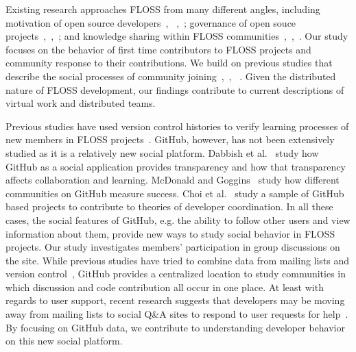 \documentclass{iitthesis}
\begin{document}
Existing research approaches FLOSS from many different angles, including
motivation of open source
developers~\cite{fang_understanding_2009},
~\cite{lakhani_why_2003},~\cite{shah_motivation_2006}; governance of open souce
projects~\cite{hippel_open_2003},~\cite{omahony_guarding_2003},~\cite{omahoney_governance_2007};
and knowledge sharing within FLOSS
communities~\cite{endres_tacit_2007},~\cite{hemetsberger_collective_2009},~\cite{sowe_understanding_2008}.
Our study focuses on the behavior of first time contributors to FLOSS projects
and community response to their contributions. We build on previous studies that
describe the social processes of community
joining~\cite{ducheneaut_socialization_2005},~\cite{huang_mining_2005}, ~\cite{von_krogh_community_2003}. Given the
distributed nature of FLOSS development, our findings contribute to current
descriptions of virtual work and distributed teams.

Previous studies have used version control histories to verify learning
processes of new members in FLOSS projects~\cite{huang_mining_2005}. GitHub,
however, has not been extensively studied as it is a relatively new social
platform. Dabbish et al.~\cite{dabbish_social_2012} study how GitHub as a social
application provides transparency and how that transparency affects
collaboration and learning. McDonald and
Goggins~\cite{mcdonald_performance_2013} study how different communities on
GitHub measure success. Choi et al.~\cite{choi_herding_2013} study a sample of
GitHub based projects to contribute to theories of developer coordination. In
all these cases, the social features of GitHub, e.g. the ability to follow other
users and view information about them, provide new ways to study social behavior
in FLOSS projects. Our study investigates members' participation in group
discussions on the site. While previous studies have tried to combine data from
mailing lists and version control~\cite{ducheneaut_socialization_2005}, GitHub
provides a centralized location to study communities in which discussion and
code contribution all occur in one place. At least with regards to user support,
recent research suggests that developers may be moving away from mailing lists
to social Q\&A sites to respond to user requests for
help~\cite{vasilescu_how_2014}. By focusing on GitHub data, we contribute to
understanding developer behavior on this new social platform.
\end{document}
